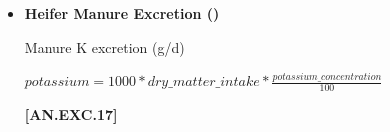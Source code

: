 \begin{refsection}
\begin{itemize}
    \begin{center}
        \(fecal\_nitrogen=(0.345+0.317 * \frac{(dry\_matter\_intake * 1000) * \frac{\frac{crude\_protein\_concentration}{6.25}}{100})}{1000}\)
    \end{center}
        \vspace{0.5cm} 
    
            {\raggedleft \textbf{[AN.EXC.15]}\par}
            \vspace{0.5cm} 

Urine N excretion (kg/d)
        \vspace{0.5cm}
    
    \begin{center}
        \(
\text{urine}_{\text{nitrogen}} = \text{manure}_{\text{nitrogen}} - \text{fecal}_{\text{nitrogen}}
\)

    \end{center}
        \vspace{0.5cm} 
    
            {\raggedleft \textbf{[AN.EXC.16]}\par}
            \vspace{0.5cm} 

Manure total ammoniacal nitrogen (kg/d) 
        \vspace{0.5cm}
    
    \begin{center}
        \(manure\_total\_ammoniacal\_nitrogen = urine\_nitrogen\)
    \end{center}
        \vspace{0.5cm} 
    
            {\raggedleft \textbf{[AN.EXC.9]}\par}
            \vspace{0.5cm} 

        \item \textbf{Heifer Manure Excretion ()}
        \vspace{0.2cm}

Manure K excretion (g/d)
        \vspace{0.5cm}
    
    \begin{center}
        \(potassium=1000 * dry\_matter\_intake * \frac{potassium\_concentration}{100}\)
    \end{center}
        \vspace{0.5cm} 
    
            {\raggedleft \textbf{[AN.EXC.17]}\par}
            \vspace{0.5cm} 


\end{itemize}
\end{refsection}
